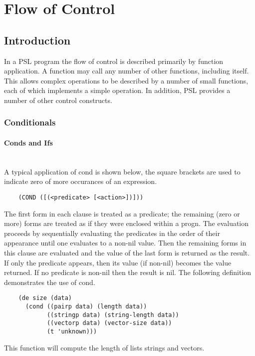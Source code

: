 \chapter*{Flow of Control}

\section{Introduction}

  In a PSL program the flow of control is described primarily by
function  application.   A function may call any number of other
functions, including itself.  This allows complex operations  to
be  described  by  a  number  of  small functions, each of which
implements a simple operation.   In  addition,  PSL  provides  a
number of other control constructs.

\subsection{Conditionals}

\subsubsection{Conds and Ifs}


\\

{    A  typical  application  of  cond is shown below, the square
    brackets are used to indicate zero of more occurances of  an
    expression.
}\\

\begin{verbatim}
    (COND ([(<predicate> [<action>])]))
\end{verbatim}
   	The first form in each clause is treated as a predicate; the
    remaining  (zero  or more) forms are treated as if they were
    enclosed  within  a  progn.    The  evaluation  proceeds  by
    sequentially evaluating the predicates in the order of their
    appearance until one evaluates to a non-nil value.  Then the
    remaining  forms  in this clause are evaluated and the value
    of the last form is returned as the result.    If  only  the
    predicate  appears,  then its value (if non-nil) becomes the
    value returned.  If no predicate is non-nil then the  result
    is  nil.    The following definition demonstrates the use of
    cond.\\

\begin{verbatim}
    (de size (data)
      (cond ((pairp data) (length data))
            ((stringp data) (string-length data))
            ((vectorp data) (vector-size data))
            (t 'unknown)))
\end{verbatim}
    This function will compute the length of lists  strings
 			and vectors.
			 
